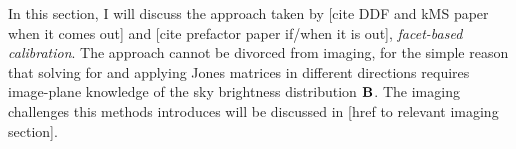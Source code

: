 \pg
In this section, I will discuss the approach taken by [cite DDF and kMS paper when it comes out] and [cite prefactor paper if/when it is out], \emph{facet-based calibration}. The approach cannot be divorced from imaging, for the simple reason that solving for and applying Jones matrices in different directions requires image-plane knowledge of the sky brightness distribution $\textbf{B}$. The imaging challenges this methods introduces will be discussed in [href to relevant imaging section].

\pg







